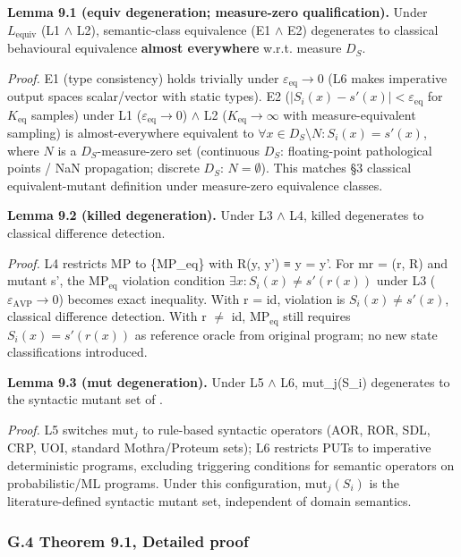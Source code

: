 \documentclass[review,12pt,authoryear]{elsarticle}
\begin{document}
\textbf{Lemma 9.1 (equiv degeneration; measure-zero
qualification).} Under $L_{\mathrm{equiv}}$ (L1 $\wedge$ L2), semantic-class equivalence
(E1 $\wedge$ E2) degenerates to classical behavioural equivalence
\textbf{almost everywhere} w.r.t. measure $D_S$.

\emph{Proof.} E1 (type consistency) holds trivially under $\varepsilon_{\mathrm{eq}} \to 0$ (L6
makes imperative output spaces scalar/vector with static types). E2
($|S_i(x) - s'(x)| < \varepsilon_{\mathrm{eq}}$ for $K_{\mathrm{eq}}$ samples)
under L1 ($\varepsilon_{\mathrm{eq}} \to 0$) $\wedge$ L2 ($K_{\mathrm{eq}} \to \infty$ with measure-equivalent sampling)
is almost-everywhere equivalent to $\forall x \in D_S \setminus N: S_i(x) = s'(x)$, where
$N$ is a $D_S$-measure-zero set (continuous $D_S$: floating-point
pathological points / NaN propagation; discrete $D_S$: $N = \emptyset$). This
matches \citet{d7c38286734419b52de4262c9802ebdfcf4b9447} §3 classical equivalent-mutant definition
under measure-zero equivalence classes.

\textbf{Lemma 9.2 (killed degeneration).} Under L3 $\wedge$ L4, killed
degenerates to classical difference detection.

\emph{Proof.} L4 restricts MP to \{MP\_eq\} with R(y, y') ≡ y = y'. For
mr = (r, R) and mutant s', the $\mathrm{MP}_{\mathrm{eq}}$ violation condition $\exists x: S_i(x) \neq
s'(r(x))$ under L3 ($\varepsilon_{\mathrm{AVP}} \to 0$) becomes exact inequality. With r = id,
violation is $S_i(x) \neq s'(x)$, classical difference detection. With r
$\neq$ id, $\mathrm{MP}_{\mathrm{eq}}$ still requires $S_i(x) = s'(r(x))$ as reference oracle from
original program; no new state classifications introduced.

\textbf{Lemma 9.3 (mut degeneration).} Under L5 $\wedge$ L6, mut\_j(S\_i)
degenerates to the syntactic mutant set of \citet{d7c38286734419b52de4262c9802ebdfcf4b9447}.

\emph{Proof.} L5 switches $\mathrm{mut}_j$ to rule-based syntactic operators (AOR,
ROR, SDL, CRP, UOI, standard Mothra/Proteum sets); L6 restricts PUTs
to imperative deterministic programs, excluding triggering conditions
for semantic operators on probabilistic/ML programs. Under this
configuration, $\mathrm{mut}_j(S_i)$ is the literature-defined syntactic mutant
set, independent of domain semantics.

\subsubsection{G.4 Theorem 9.1, Detailed proof}\label{g.4-theorem-9.1-detailed-proof}
\end{document}
